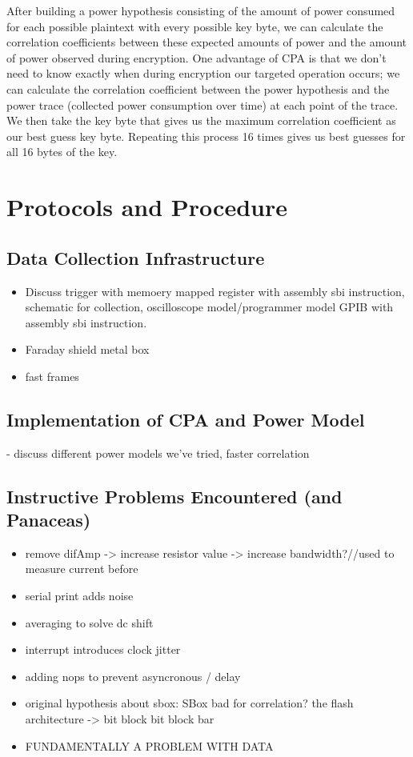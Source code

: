 \documentclass[journal]{ieee_style}
\begin{document}
After building a power hypothesis consisting of the amount of power consumed for each possible plaintext with every possible key byte, we can calculate the correlation coefficients between these expected amounts of power and the amount of power observed during encryption. One advantage of CPA is that we don't need to know exactly when during encryption our targeted operation occurs; we can calculate the correlation coefficient between the power hypothesis and the power trace (collected power consumption over time) at each point of the trace. We then take the key byte that gives us the maximum correlation coefficient as our best guess key byte. Repeating this process 16 times gives us best guesses for all 16 bytes of the key.


\section{Protocols and Procedure}

\subsection{Data Collection Infrastructure}
\begin{itemize}[-]
    \item Discuss trigger with memoery mapped register with assembly sbi instruction, schematic for collection, oscilloscope model/programmer model GPIB with assembly sbi instruction. 
\item Faraday shield metal box
\item fast frames
\end{itemize}

\subsection{Implementation of CPA and Power Model}
- discuss different power models we've tried, faster correlation

\subsection{Instructive Problems Encountered (and Panaceas)}


\begin{itemize}[-]
\item remove difAmp -> increase resistor value -> increase bandwidth?//used to measure current before
\item serial print adds noise
\item averaging to solve dc shift
\item interrupt introduces clock jitter
\item adding nops to prevent asyncronous / delay
\item original hypothesis about sbox:  SBox bad for correlation? the flash architecture -> bit block bit block bar
\item FUNDAMENTALLY A PROBLEM WITH DATA
\end{itemize}
\end{document}
